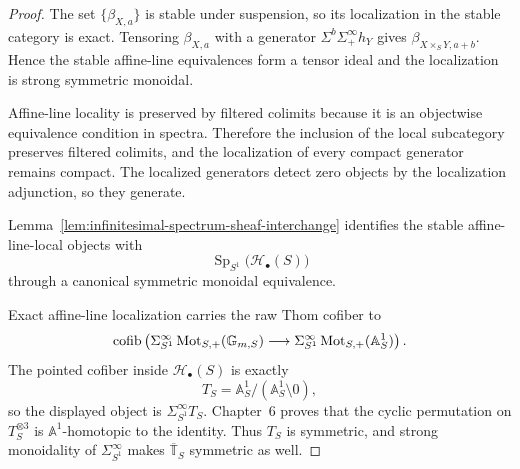 \begin{proof}
The set $\{\beta_{X,a}\}$ is stable under suspension, so its localization in
the stable category is exact.  Tensoring $\beta_{X,a}$ with a generator
$\Sigma^b\Sigma^\infty_+h_Y$ gives $\beta_{X\times_SY,a+b}$.  Hence the
stable affine-line equivalences form a tensor ideal and the localization is
strong symmetric monoidal.

Affine-line locality is preserved by filtered colimits because it is an
objectwise equivalence condition in spectra.  Therefore the inclusion of the
local subcategory preserves filtered colimits, and the localization of every
compact generator remains compact.  The localized generators detect zero
objects by the localization adjunction, so they generate.

Lemma~\ref{lem:infinitesimal-spectrum-sheaf-interchange} identifies the
stable affine-line-local objects with
\[
    \operatorname{Sp}_{S^1}\bigl(\mathcal H_\bullet(S)\bigr)
\]
through a canonical symmetric monoidal equivalence.

Exact affine-line localization carries the raw Thom cofiber to
\[
    \operatorname{cofib}\left(
      \Sigma^\infty_{S^1}\operatorname{Mot}_{S,+}(\mathbb G_{m,S})
      \longrightarrow
      \Sigma^\infty_{S^1}\operatorname{Mot}_{S,+}(\mathbb A^1_S)
    \right).
\]
The pointed cofiber inside $\mathcal H_\bullet(S)$ is exactly
\[
    T_S=\mathbb A^1_S/(\mathbb A^1_S\setminus0),
\]
so the displayed object is $\Sigma^\infty_{S^1}T_S$.  Chapter~6 proves that
the cyclic permutation on $T_S^{\otimes3}$ is $\mathbb A^1$-homotopic to the
identity.  Thus $T_S$ is symmetric, and strong monoidality of
$\Sigma^\infty_{S^1}$ makes $\overline{\mathbb T}_S$ symmetric as well.
\end{proof}

